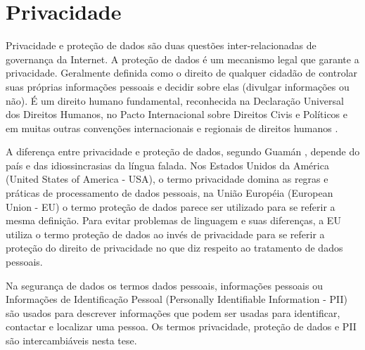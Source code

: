 \chapter{Privacidade}
\label{cap:privacidade}




Privacidade e proteção de dados são duas questões inter-relacionadas de governança da Internet. A proteção de dados é um mecanismo legal que garante a privacidade. Geralmente definida como o direito de qualquer cidadão de controlar suas próprias informações pessoais e decidir sobre elas (divulgar informações ou não). É um direito humano fundamental, reconhecida na Declaração Universal dos Direitos Humanos, no Pacto Internacional sobre Direitos Civis e Políticos e em muitas outras convenções internacionais e regionais de direitos humanos \cite{DWObservatory2022:online}.

A diferença entre privacidade e proteção de dados, segundo Guamán \cite{dsguaman2016:online}, depende do país e das idiossincrasias da língua falada. Nos Estados Unidos da América (United States of America - USA), o termo privacidade domina as regras e práticas de processamento de dados pessoais, na União Européia (European Union - EU) o termo proteção de dados parece ser utilizado para se referir a mesma definição. Para evitar problemas de linguagem e suas diferenças, a EU utiliza o termo proteção de dados ao invés de privacidade para se referir a proteção do direito de privacidade no que diz respeito ao tratamento de dados pessoais.

Na segurança de dados os termos dados pessoais, informações pessoais ou Informações de Identificação Pessoal (Personally Identifiable Information - PII) são usados para descrever informações que podem ser usadas para identificar, contactar e localizar uma pessoa. Os termos privacidade, proteção de dados e PII são intercambiáveis nesta tese. %

